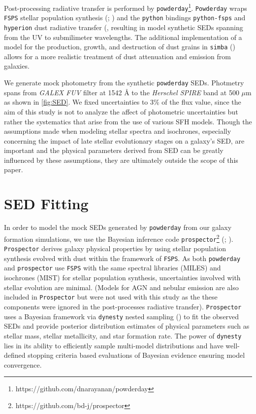 \documentclass[twocolumn]{aastex62}
\begin{document}
Post-processing radiative transfer is performed by \texttt{powderday}\footnote{https://github.com/dnarayanan/powderday}. \texttt{Powderday} wraps \texttt{FSPS} stellar population synthesis (\cite{conroy_propagation_2009}; \cite{conroy_propagation_2010}) and the \texttt{python} bindings \texttt{python-fsps} and \texttt{hyperion} dust radiative transfer (\cite{robitaille_hyperion:_2011}, resulting in model synthetic SEDs spanning from the UV to submilimeter wavelengths. The additional implementation of a model for the production, growth, and destruction of dust grains in \texttt{simba} (\cite{li_dust--gas_2019}) allows for a more realistic treatment of dust attenuation and emission from galaxies. 

We generate mock photometry from the synthetic \texttt{powderday} SEDs. Photmetry spans from \textit{GALEX FUV} filter at 1542 {\AA} to the \textit{Herschel SPIRE} band at 500 $\mu$m as shown in \ref{fig:SED}. We fixed uncertainties to 3\% of the flux value, since the aim of this study is not to analyze the affect of photometric uncertainties but rather the systematics that arise from the use of various SFH models. Though the assumptions made when modeling stellar spectra and isochrones, especially concerning the impact of late stellar evolutionary stages on a galaxy's SED, are important and the physical parameters derived from SED can be greatly influenced by these assumptions, they are ultimately outside the scope of this paper. 



\section{SED Fitting}


In order to model the mock SEDs generated by \texttt{powderday} from our galaxy formation simulations, we use the Bayesian inference code \texttt{prospector}\footnote{https://github.com/bd-j/prospector} (\cite{leja_deriving_2017}; \cite{leja_how_2019}). \texttt{Prospector} derives galaxy physical properties by using stellar population synthesis evolved with dust within the framework of \texttt{FSPS}. As both \texttt{powderday} and \texttt{prospector} use \texttt{FSPS} with the same spectral libraries (MILES) and isochrones (MIST) for stellar population synthesis, uncertainties involved with stellar evolution are minimal. (Models for AGN and nebular emission are also included in \texttt{Prospector} but were not used with this study as the these components were ignored in the post-processes radiative transfer). \texttt{Prospector} uses a Bayesian framework via \texttt{dynesty} nested sampling (\cite{speagle_dynesty:_2019}) to fit the observed SEDs and provide posterior distribution estimates of physical parameters such as stellar mass, stellar metallicity, and star formation rate. The power of \texttt{dynesty} lies in its ability to efficiently sample multi-model distributions and have well-defined stopping criteria based evaluations of Bayesian evidence ensuring model convergence.
\end{document}
